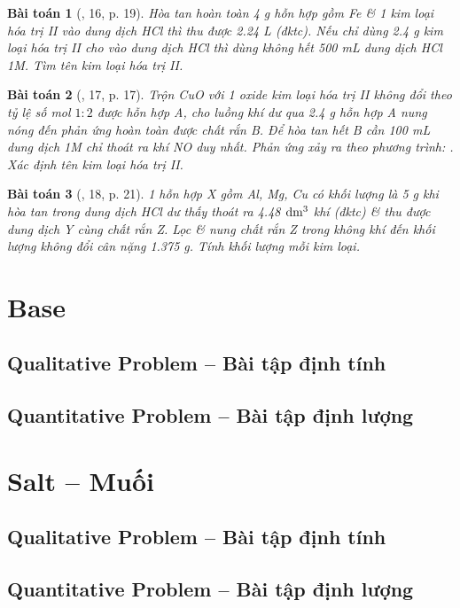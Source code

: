 \documentclass{article}
\newtheorem{baitoan}{Bài toán}
\begin{document}
\begin{baitoan}[\cite{An_350_BT_Hoa_Hoc_9}, 16, p. 19]
	Hòa tan hoàn toàn \emph{4 g} hỗn hợp gồm \emph{Fe} \& 1 kim loại hóa trị II vào dung dịch \emph{HCl} thì thu được \emph{2.24 L } (đktc). Nếu chỉ dùng \emph{2.4 g} kim loại hóa trị II cho vào dung dịch \emph{HCl} thì dùng không hết \emph{500 mL} dung dịch \emph{HCl 1M}. Tìm tên kim loại hóa trị II.
\end{baitoan}

\begin{baitoan}[\cite{An_350_BT_Hoa_Hoc_9}, 17, p. 17]
	Trộn \emph{CuO} với 1 oxide kim loại hóa trị II không đổi theo tỷ lệ số mol $1:2$ được hỗn hợp A, cho luồng khí \emph{} dư qua \emph{2.4 g} hỗn hợp A nung nóng đến phản ứng hoàn toàn được chất rắn B. Để hòa tan hết B cần \emph{100 mL} dung dịch \emph{ 1M} chỉ thoát ra khí \emph{NO} duy nhất. Phản ứng xảy ra theo phương trình: \emph{}. Xác định tên kim loại hóa trị II.
\end{baitoan}

\begin{baitoan}[\cite{An_350_BT_Hoa_Hoc_9}, 18, p. 21]
	1 hỗn hợp X gồm \emph{Al, Mg, Cu} có khối lượng là \emph{5 g} khi hòa tan trong dung dịch \emph{HCl} dư thấy thoát ra \emph{4.48 $\rm dm^3$} khí (đktc) \& thu được dung dịch Y cùng chất rắn Z. Lọc \& nung chất rắn Z trong không khí đến khối lượng không đổi cân nặng \emph{1.375 g}. Tính khối lượng mỗi kim loại.
\end{baitoan}


\section{Base}

\subsection{Qualitative Problem -- Bài tập định tính}

\subsection{Quantitative Problem -- Bài tập định lượng}


\section{Salt -- Muối}

\subsection{Qualitative Problem -- Bài tập định tính}

\subsection{Quantitative Problem -- Bài tập định lượng}


\printbibliography[heading=bibintoc]
	
\end{document}
